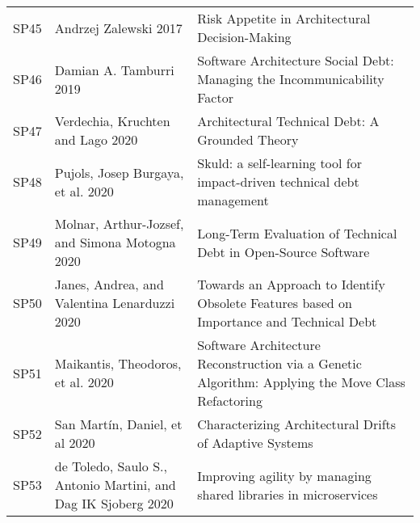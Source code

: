 \begin{tabular}{lll}
 SP45 &                                                    Andrzej Zalewski 2017 &                                                                                                                            Risk Appetite in Architectural Decision-Making \\
 SP46 &                                                  Damian A. Tamburri 2019 &                                                                                                  Software Architecture Social Debt: Managing the Incommunicability Factor \\
 SP47 &                                        Verdechia, Kruchten and Lago 2020 &                                                                                                                           Architectural Technical Debt: A Grounded Theory \\
 SP48 &                                       Pujols, Josep Burgaya, et al. 2020 &                                                                                                   Skuld: a self-learning tool for impact-driven technical debt management \\
 SP49 &                           Molnar, Arthur-Jozsef, and Simona Motogna 2020 &                                                                                                            Long-Term Evaluation of Technical Debt in Open-Source Software \\
 SP50 &                             Janes, Andrea, and Valentina Lenarduzzi 2020 &                                                                                  Towards an Approach to Identify Obsolete Features based on Importance and Technical Debt \\
 SP51 &                                        Maikantis, Theodoros, et al. 2020 &                                                                         Software Architecture Reconstruction via a Genetic Algorithm: Applying the Move Class Refactoring \\
 SP52 &                                           San Martín, Daniel, et al 2020 &                                                                                                                   Characterizing Architectural Drifts of Adaptive Systems \\
 SP53 &            de Toledo, Saulo S., Antonio Martini, and Dag IK Sjoberg 2020 &                                                                                                           Improving agility by managing shared libraries in microservices \\

\end{tabular}
